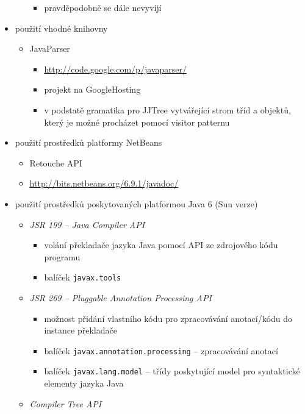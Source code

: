 \begin{itemize}
\begin{itemize}
\begin{itemize}
    \item pravděpodobně se dále nevyvíjí
    \end{itemize}
  \end{itemize}
\item použití vhodné knihovny
  \begin{itemize}
  \item JavaParser
    \begin{itemize}
    \item \href{http://code.google.com/p/javaparser/}{http://code.google.com/p/javaparser/}
    \item projekt na GoogleHosting
    \item v podstatě gramatika pro JJTree vytvářející strom tříd a objektů, který je možné procházet pomocí visitor patternu
    \end{itemize}
  \end{itemize}
\item použití prostředků platformy NetBeans
  \begin{itemize}
  \item Retouche API
  \item \href{http://bits.netbeans.org/6.9.1/javadoc/}{http://bits.netbeans.org/6.9.1/javadoc/}
  \end{itemize}
\item použití prostředků poskytovaných platformou Java 6 (Sun verze) \cite{source_code_analysis_corejavatechtips}
  \begin{itemize}
  \item \emph{JSR 199 -- Java Compiler API}
    \begin{itemize}
    \item volání překladače jazyka Java pomocí API ze zdrojového kódu programu
    \item balíček \verb+javax.tools+
    \end{itemize}
  \item \emph{JSR 269 -- Pluggable Annotation Processing API}
    \begin{itemize}
    \item možnost přidání vlastního kódu pro zpracovávání anotací/kódu do instance překladače
    \item balíček \verb+javax.annotation.processing+ -- zpracovávání anotací
    \item balíček \verb+javax.lang.model+ -- třídy poskytující model pro syntaktické elementy jazyka Java
    \end{itemize}
  \item \emph{Compiler Tree API}

\end{itemize}
\end{itemize}
